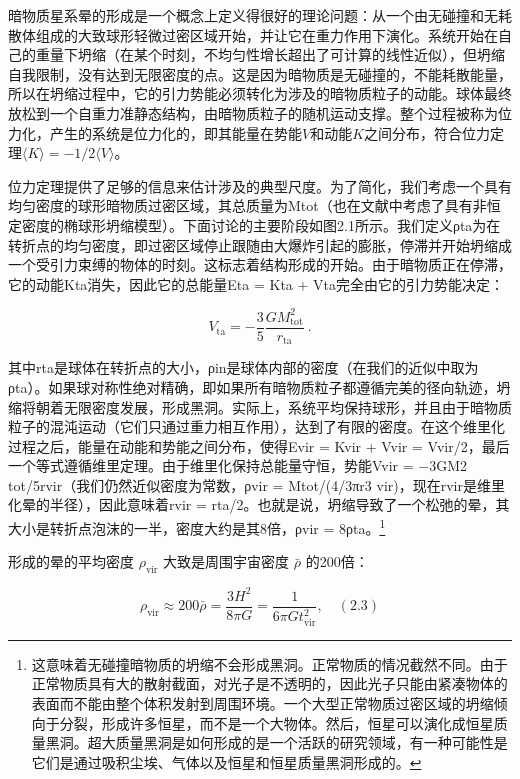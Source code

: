 
暗物质星系晕的形成是一个概念上定义得很好的理论问题：从一个由无碰撞和无耗散体组成的大致球形轻微过密区域开始，并让它在重力作用下演化。系统开始在自己的重量下坍缩（在某个时刻，不均匀性增长超出了可计算的线性近似），但坍缩自我限制，没有达到无限密度的点。这是因为暗物质是无碰撞的，不能耗散能量，所以在坍缩过程中，它的引力势能必须转化为涉及的暗物质粒子的动能。球体最终放松到一个自重力准静态结构，由暗物质粒子的随机运动支撑。整个过程被称为位力化，产生的系统是位力化的，即其能量在势能$V$和动能$K$之间分布，符合位力定理$\langle K\rangle  = -1/2 \langle V\rangle $。

位力定理提供了足够的信息来估计涉及的典型尺度。为了简化，我们考虑一个具有均匀密度的球形暗物质过密区域，其总质量为Mtot（也在文献中考虑了具有非恒定密度的椭球形坍缩模型）。下面讨论的主要阶段如图2.1所示。我们定义ρta为在转折点的均匀密度，即过密区域停止跟随由大爆炸引起的膨胀，停滞并开始坍缩成一个受引力束缚的物体的时刻。这标志着结构形成的开始。由于暗物质正在停滞，它的动能Kta消失，因此它的总能量Eta = Kta + Vta完全由它的引力势能决定：

\[ V_{\text{ta}} = -\frac{3}{5} \frac{G M_{\text{tot}}^2}{r_{\text{ta}}} ~.\]

其中rta是球体在转折点的大小，ρin是球体内部的密度（在我们的近似中取为ρta）。如果球对称性绝对精确，即如果所有暗物质粒子都遵循完美的径向轨迹，坍缩将朝着无限密度发展，形成黑洞。实际上，系统平均保持球形，并且由于暗物质粒子的混沌运动（它们只通过重力相互作用），达到了有限的密度。在这个维里化过程之后，能量在动能和势能之间分布，使得Evir = Kvir + Vvir = Vvir/2，最后一个等式遵循维里定理。由于维里化保持总能量守恒，势能Vvir = −3GM2 tot/5rvir（我们仍然近似密度为常数，ρvir = Mtot/(4/3πr3 vir)，现在rvir是维里化晕的半径），因此意味着rvir = rta/2。也就是说，坍缩导致了一个松弛的晕，其大小是转折点泡沫的一半，密度大约是其8倍，ρvir = 8ρta。\footnote{这意味着无碰撞暗物质的坍缩不会形成黑洞。正常物质的情况截然不同。由于正常物质具有大的散射截面，对光子是不透明的，因此光子只能由紧凑物体的表面而不能由整个体积发射到周围环境。一个大型正常物质过密区域的坍缩倾向于分裂，形成许多恒星，而不是一个大物体。然后，恒星可以演化成恒星质量黑洞。超大质量黑洞是如何形成的是一个活跃的研究领域，有一种可能性是它们是通过吸积尘埃、气体以及恒星和恒星质量黑洞形成的。}

形成的晕的平均密度 \(\rho_{\text{vir}}\) 大致是周围宇宙密度 \(\bar{\rho}\) 的200倍：

\[ \rho_{\text{vir}} \approx 200 \bar{\rho} = \frac{3H^2}{8\pi G} = \frac{1}{6\pi G t^2_{\text{vir}}}, \quad (2.3) \]


